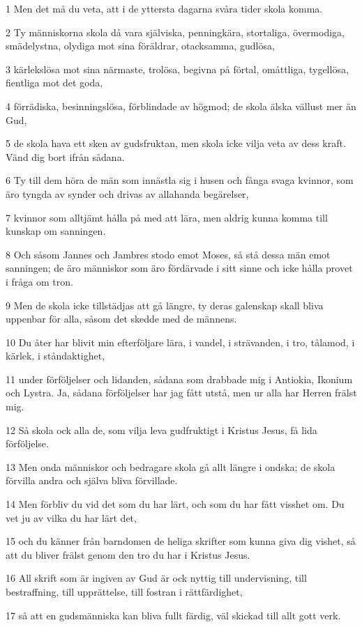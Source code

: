 \par 1 Men det må du veta, att i de yttersta dagarna svåra tider skola komma.
\par 2 Ty människorna skola då vara själviska, penningkära, stortaliga, övermodiga, smädelystna, olydiga mot sina föräldrar, otacksamma, gudlösa,
\par 3 kärlekslösa mot sina närmaste, trolösa, begivna på förtal, omåttliga, tygellösa, fientliga mot det goda,
\par 4 förrädiska, besinningslösa, förblindade av högmod; de skola älska vällust mer än Gud,
\par 5 de skola hava ett sken av gudsfruktan, men skola icke vilja veta av dess kraft. Vänd dig bort ifrån sådana.
\par 6 Ty till dem höra de män som innästla sig i husen och fånga svaga kvinnor, som äro tyngda av synder och drivas av allahanda begärelser,
\par 7 kvinnor som alltjämt hålla på med att lära, men aldrig kunna komma till kunskap om sanningen.
\par 8 Och såsom Jannes och Jambres stodo emot Moses, så stå dessa män emot sanningen; de äro människor som äro fördärvade i sitt sinne och icke hålla provet i fråga om tron.
\par 9 Men de skola icke tillstädjas att gå längre, ty deras galenskap skall bliva uppenbar för alla, såsom det skedde med de männens.
\par 10 Du åter har blivit min efterföljare lära, i vandel, i strävanden, i tro, tålamod, i kärlek, i ståndaktighet,
\par 11 under förföljelser och lidanden, sådana som drabbade mig i Antiokia, Ikonium och Lystra. Ja, sådana förföljelser har jag fått utstå, men ur alla har Herren frälst mig.
\par 12 Så skola ock alla de, som vilja leva gudfruktigt i Kristus Jesus, få lida förföljelse.
\par 13 Men onda människor och bedragare skola gå allt längre i ondska; de skola förvilla andra och själva bliva förvillade.
\par 14 Men förbliv du vid det som du har lärt, och som du har fått visshet om. Du vet ju av vilka du har lärt det,
\par 15 och du känner från barndomen de heliga skrifter som kunna giva dig vishet, så att du bliver frälst genom den tro du har i Kristus Jesus.
\par 16 All skrift som är ingiven av Gud är ock nyttig till undervisning, till bestraffning, till upprättelse, till fostran i rättfärdighet,
\par 17 så att en gudsmänniska kan bliva fullt färdig, väl skickad till allt gott verk.

